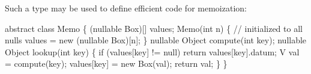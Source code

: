 Such a type may be used to define efficient code for memoization:

\begin{x10}
 abstract class Memo  \{
   (nullable Box)[]  values; 
   Memo(int n) \{
     // initialized to all nulls
     values = new (nullable Box)[n]; 
   \}
   nullable Object compute(int key); 
   nullable Object lookup(int key) \{ 
    if (values[key] != null) 
      return values[key].datum;
    V val = compute(key);
    values[key] = new Box(val);
    return val;
   \}
 \}
\end{x10}



 


